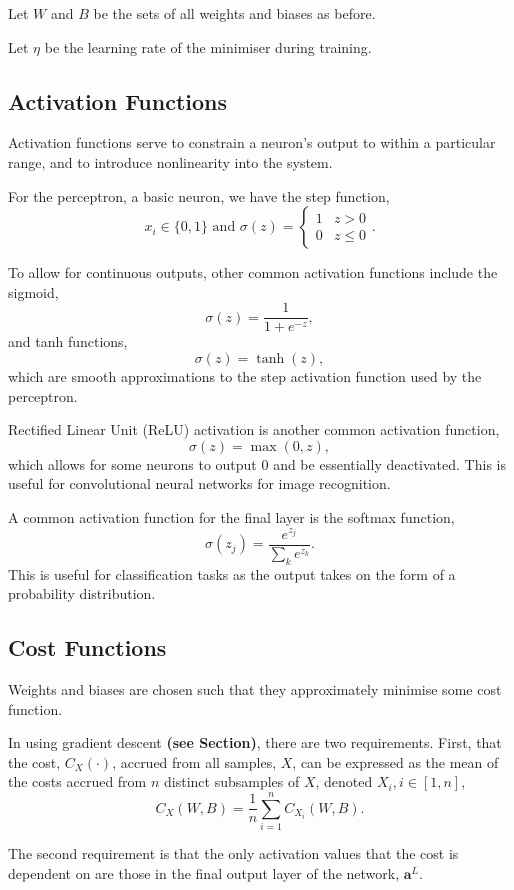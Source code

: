 \documentclass[honours,12pt]{unswthesis}
\numberwithin{equation}{section}
\begin{document}
Let $W$ and $B$ be the sets of all weights and biases as before.

Let $\eta$ be the learning rate of the minimiser during training.

\subsection{Activation Functions}\label{nnets-act}

Activation functions serve to constrain a neuron's output to within a particular range, and to introduce nonlinearity into the system. 

For the perceptron, a basic neuron, we have the step function,
\[
	x_i \in \{0,1\} \text{ and } \sigma(z) = \begin{cases}
		1 & z > 0 \\
		0 & z \le 0
	\end{cases}.
\]

To allow for continuous outputs, other common activation functions include the sigmoid,
\[
	\sigma(z) = \dfrac{1}{1+e^{-z}},
\]
and tanh functions,
\[
	\sigma(z) = \tanh(z),
\]
which are smooth approximations to the step activation function used by the perceptron.

Rectified Linear Unit (ReLU) activation is another common activation function,
\[
	\sigma(z) = \max(0, z),
\]
which allows for some neurons to output 0 and be essentially deactivated. This is useful for convolutional neural networks for image recognition.

A common activation function for the final layer is the softmax function,
\[
	\sigma(z_j) = \dfrac{e^{z_j}}{\sum_ke^{z_k}}.
\]
This is useful for classification tasks as the output takes on the form of a probability distribution.

\subsection{Cost Functions}\label{nnets-cost}

Weights and biases are chosen such that they approximately minimise some cost function.

In using gradient descent \textbf{(see Section)}, there are two requirements. First, that the cost, $C_X(\cdot)$, accrued from all samples, $X$, can be expressed as the mean of the costs accrued from $n$ distinct subsamples of $X$, denoted $X_i, i \in[1,n]$,
\[
	C_X(W, B) = \dfrac{1}{n}\sum_{i = 1}^nC_{X_i}(W,B).
\]

The second requirement is that the only activation values that the cost is dependent on are those in the final output layer of the network, $\mathbf{a}^L$.
\end{document}
